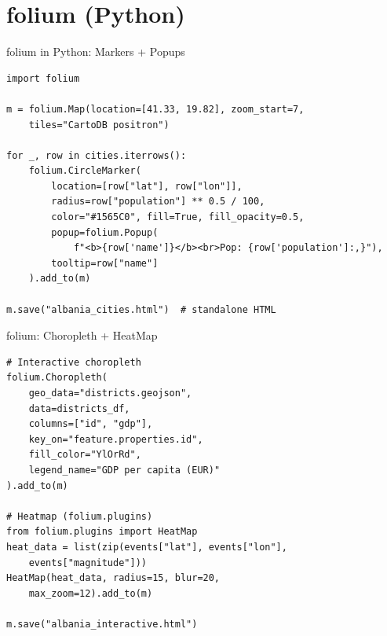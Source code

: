\documentclass[10pt]{beamer}
\begin{document}
\section{folium (Python)}
\begin{frame}[fragile]{folium in Python: Markers + Popups}
\begin{lstlisting}[style=pythonstyle]
import folium

m = folium.Map(location=[41.33, 19.82], zoom_start=7,
    tiles="CartoDB positron")

for _, row in cities.iterrows():
    folium.CircleMarker(
        location=[row["lat"], row["lon"]],
        radius=row["population"] ** 0.5 / 100,
        color="#1565C0", fill=True, fill_opacity=0.5,
        popup=folium.Popup(
            f"<b>{row['name']}</b><br>Pop: {row['population']:,}"),
        tooltip=row["name"]
    ).add_to(m)

m.save("albania_cities.html")  # standalone HTML
\end{lstlisting}
\end{frame}
\begin{frame}[fragile]{folium: Choropleth + HeatMap}
\begin{lstlisting}[style=pythonstyle]
# Interactive choropleth
folium.Choropleth(
    geo_data="districts.geojson",
    data=districts_df,
    columns=["id", "gdp"],
    key_on="feature.properties.id",
    fill_color="YlOrRd",
    legend_name="GDP per capita (EUR)"
).add_to(m)

# Heatmap (folium.plugins)
from folium.plugins import HeatMap
heat_data = list(zip(events["lat"], events["lon"],
    events["magnitude"]))
HeatMap(heat_data, radius=15, blur=20,
    max_zoom=12).add_to(m)

m.save("albania_interactive.html")
\end{lstlisting}
\end{frame}
\end{document}
